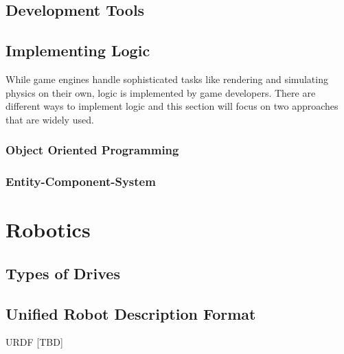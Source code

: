 \subsection{Development Tools}


\subsection{Implementing Logic}
While game engines handle sophisticated tasks like rendering and simulating physics on their own, logic is implemented by game developers. There are different ways to implement logic and this section will focus on two approaches that are widely used.

\subsubsection{Object Oriented Programming}


\subsubsection{Entity-Component-System}



\section{Robotics}
\subsection{Types of Drives}
\subsection{Unified Robot Description Format}
\ac{URDF} [TBD]